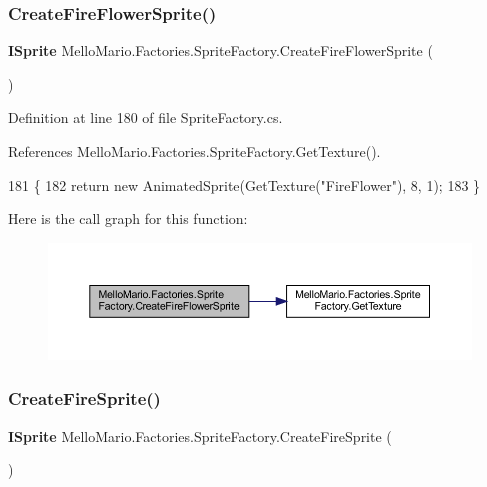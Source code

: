 \subsubsection{Create\+Fire\+Flower\+Sprite()}
{\footnotesize\ttfamily \textbf{ I\+Sprite} Mello\+Mario.\+Factories.\+Sprite\+Factory.\+Create\+Fire\+Flower\+Sprite (\begin{DoxyParamCaption}{ }\end{DoxyParamCaption})}



Definition at line 180 of file Sprite\+Factory.\+cs.



References Mello\+Mario.\+Factories.\+Sprite\+Factory.\+Get\+Texture().


\begin{DoxyCode}
181         \{
182             \textcolor{keywordflow}{return} \textcolor{keyword}{new} AnimatedSprite(GetTexture(\textcolor{stringliteral}{"FireFlower"}), 8, 1);
183         \}
\end{DoxyCode}
Here is the call graph for this function\+:
\nopagebreak
\begin{figure}[H]
\begin{center}
\leavevmode
\includegraphics[width=350pt]{classMelloMario_1_1Factories_1_1SpriteFactory_abee128ffc6f83e1c4c9f3500f54113e9_cgraph}
\end{center}
\end{figure}
\mbox{\label{classMelloMario_1_1Factories_1_1SpriteFactory_a70f7b0e681f40656b64a0109b90f7921}} 
\subsubsection{Create\+Fire\+Sprite()}
{\footnotesize\ttfamily \textbf{ I\+Sprite} Mello\+Mario.\+Factories.\+Sprite\+Factory.\+Create\+Fire\+Sprite (\begin{DoxyParamCaption}{ }\end{DoxyParamCaption})}



